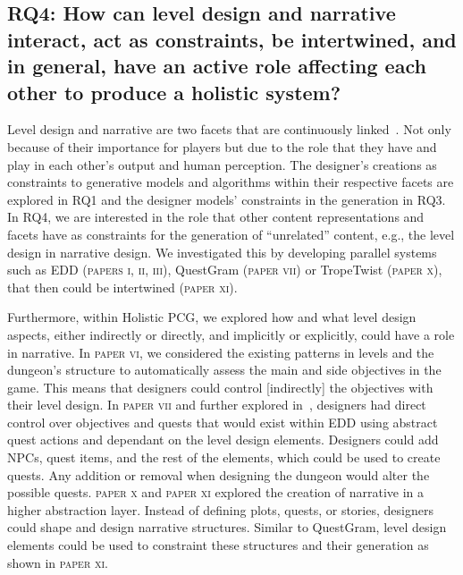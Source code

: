 \subsection[Research Question 4]{RQ4: How can level design and narrative interact, act as constraints, be intertwined, and in general, have an active role affecting each other to produce a holistic system?  }


Level design and narrative are two facets that are continuously linked~\cite{kishino_hunt_2005,ashmore_quest_2007,kybartas_quinn_survey_2017}. Not only because of their importance for players but due to the role that they have and play in each other's output and human perception. The designer's creations as constraints to generative models and algorithms within their respective facets are explored in RQ1 and the designer models' constraints in the generation in RQ3. In RQ4, we are interested in the role that other content representations and facets have as constraints for the generation of ``unrelated'' content, e.g., the level design in narrative design. We investigated this by developing parallel systems such as EDD (\textsc{papers i, ii, iii}), QuestGram (\textsc{paper vii}) or TropeTwist (\textsc{paper x}), that then could be intertwined (\textsc{paper xi}). 

Furthermore, within Holistic PCG, we explored how and what level design aspects, either indirectly or directly, and implicitly or explicitly, could have a role in narrative. In \textsc{paper vi}, we considered the existing patterns in levels and the dungeon's structure to automatically assess the main and side objectives in the game. This means that designers could control [indirectly] the objectives with their level design. In \textsc{paper vii} and further explored in~\cite{larsson_queststories_2021}, designers had direct control over objectives and quests that would exist within EDD using abstract quest actions and dependant on the level design elements. Designers could add NPCs, quest items, and the rest of the elements, which could be used to create quests. Any addition or removal when designing the dungeon would alter the possible quests. \textsc{paper x} and \textsc{paper xi} explored the creation of narrative in a higher abstraction layer. Instead of defining plots, quests, or stories, designers could shape and design narrative structures. Similar to QuestGram, level design elements could be used to constraint these structures and their generation as shown in \textsc{paper xi}.


